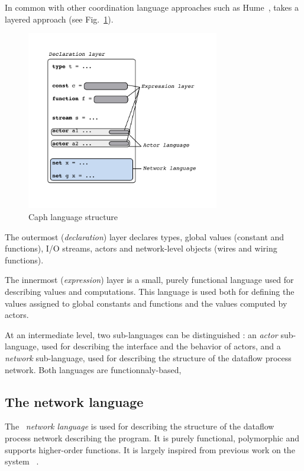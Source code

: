 In common with other coordination language approaches such as 
Hume~\cite{Hume}, \caph takes a layered approach (see Fig.~\ref{fig:languagestruct}).

\begin{figure}[h]
  \centering
  \includegraphics[width=0.75\textwidth]{figs/languagestruct}
  \caption{Caph language structure}
  \label{fig:languagestruct}
\end{figure}

The outermost (\emph{declaration}) layer declares types, global values (constant and functions), I/O streams, actors and
network-level objects (wires and wiring functions).

The innermost (\emph{expression}) layer is a small, purely functional language used for describing
values and computations. This language is used both for defining the values assigned to global constants and
functions and the values computed by actors.

At an intermediate level, two sub-languages can be distinguished : an \emph{actor} sub-language,
used for describing the interface and the behavior of actors, and a \emph{network} sub-language,
used for describing the structure of the dataflow process network. 
Both languages are functionnaly-based, 

\subsection{The network language}
\label{sec:network-lang}

The \caph\ {\it network language} is used for describing the structure of the dataflow process
network describing the program. It is purely functional, polymorphic and supports higher-order
functions. It is largely inspired from previous work on the \fgn system ~\cite{FGN}.

